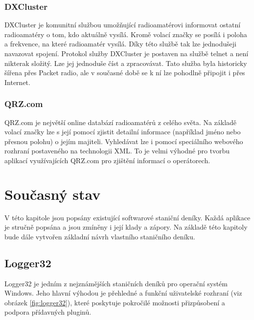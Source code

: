 \subsection{DXCluster}

DXCluster je komunitní službou umožňující radioamatérovi informovat ostatní
radioamatéry o tom, kdo aktuálně vysílá. Kromě
volací značky se posílá i poloha a frekvence, na které radioamatér vysílá. Díky této službě tak lze jednodušeji navazovat
spojení. Protokol služby DXCluster je postaven na službě telnet a není nikterak
složitý. Lze jej jednoduše číst a zpracovávat. Tato služba byla historicky
šířena přes Packet radio, ale v současné době se k ní lze pohodlně připojit i přes
Internet.

\subsection{QRZ.com}

QRZ.com je největší online databází radioamatérů z celého světa. Na základě volací značky lze s její pomocí zjistit detailní
informace (například jméno nebo přesnou polohu) o jejím majiteli. Vyhledávat lze i pomocí speciálního webového rozhraní
postaveného na technologii XML. To je velmi výhodné pro tvorbu aplikací využívajících QRZ.com pro zjištění informací o
operátorech.

\chapter{Současný stav}
\label{soucasnost}

V této kapitole jsou popsány existující softwarové staniční deníky. Každá aplikace je stručně
popsána a jsou zmíněny i její klady a zápory. Na základě této kapitoly bude dále
vytvořen základní návrh vlastního staničního deníku.

\section{Logger32}%

Logger32 je jedním z nejznámějších staničních deníků pro operační systém Windows. Jeho hlavní výhodou je přehledné a funkční
uživatelské rozhraní (viz obrázek \ref{fig:logger32}), které poskytuje pokročilé možnosti přizpůsobení a podpora přídavných pluginů.

